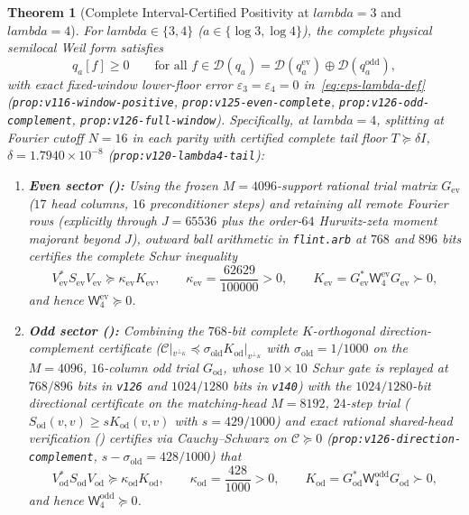 \documentclass[11pt]{article}
\def\lambda{lambda}%
\newtheorem{theorem}{Theorem}[section]
\theoremstyle{remark}
\begin{document}
\begin{theorem}[Complete Interval-Certified Positivity at $\lambda = 3$ and $\lambda = 4$]
\label{thm:lambda4-positivity}
For $\lambda \in \{3, 4\}$ ($a \in \{\log 3, \log 4\}$), the complete physical semilocal Weil form satisfies
\begin{equation}
  q_a[f] \ge 0 \qquad \text{for all } f \in \mathcal{D}(q_a) = \mathcal{D}(q_a^{\mathrm{ev}}) \oplus \mathcal{D}(q_a^{\mathrm{odd}}),
\end{equation}
with exact fixed-window lower-floor error $\varepsilon_3 = \varepsilon_4 = 0$ in~\eqref{eq:eps-lambda-def} (\texttt{prop:v116-window-positive}, \texttt{prop:v125-even-complete}, \texttt{prop:v126-odd-complement}, \texttt{prop:v126-full-window}). Specifically, at $\lambda = 4$, splitting at Fourier cutoff $N = 16$ in each parity with certified complete tail floor $T \succeq \delta I$, $\delta = 1.7940 \times 10^{-8}$ (\texttt{prop:v120-lambda4-tail}):
\begin{enumerate}[label=(\alph*)]
  \item \textbf{Even sector ():} Using the frozen $M = 4096$-support rational trial matrix $G_{\mathrm{ev}}$ ($17$ head columns, $16$ preconditioner steps) and retaining all remote Fourier rows (explicitly through $J = 65536$ plus the order-$64$ Hurwitz-zeta moment majorant beyond $J$), outward ball arithmetic in \texttt{flint.arb} at $768$ and $896$ bits certifies the complete Schur inequality
  \[
    V_{\mathrm{ev}}^* S_{\mathrm{ev}} V_{\mathrm{ev}} \succeq \kappa_{\mathrm{ev}} K_{\mathrm{ev}}, \qquad \kappa_{\mathrm{ev}} = \frac{62629}{100000} > 0, \qquad K_{\mathrm{ev}} = G_{\mathrm{ev}}^*\mathsf{W}_4^{\mathrm{ev}} G_{\mathrm{ev}} \succ 0,
  \]
  and hence $\mathsf{W}_4^{\mathrm{ev}} \succeq 0$.
  \item \textbf{Odd sector ():} Combining the $768$-bit complete $K$-orthogonal direction-complement certificate ($\mathcal{C}|_{v^{\perp_K}} \preceq \sigma_{\mathrm{old}} K_{\mathrm{od}}|_{v^{\perp_K}}$ with $\sigma_{\mathrm{old}} = 1/1000$ on the $M = 4096$, $16$-column odd trial $G_{\mathrm{od}}$, whose $10\times 10$ Schur gate is replayed at $768/896$ bits in \texttt{v126} and $1024/1280$ bits in \texttt{v140}) with the $1024/1280$-bit directional certificate on the matching-head $M = 8192$, $24$-step trial ($S_{\mathrm{od}}(v,v) \ge s K_{\mathrm{od}}(v,v)$ with $s = 429/1000$) and exact rational shared-head verification () certifies via Cauchy--Schwarz on $\mathcal{C} \succeq 0$ (\texttt{prop:v126-direction-complement}, $s - \sigma_{\mathrm{old}} = 428/1000$) that
  \[
    V_{\mathrm{od}}^* S_{\mathrm{od}} V_{\mathrm{od}} \succeq \kappa_{\mathrm{od}} K_{\mathrm{od}}, \qquad \kappa_{\mathrm{od}} = \frac{428}{1000} > 0, \qquad K_{\mathrm{od}} = G_{\mathrm{od}}^*\mathsf{W}_4^{\mathrm{odd}} G_{\mathrm{od}} \succ 0,
  \]
  and hence $\mathsf{W}_4^{\mathrm{odd}} \succeq 0$.
\end{enumerate}
\end{theorem}
\end{document}
